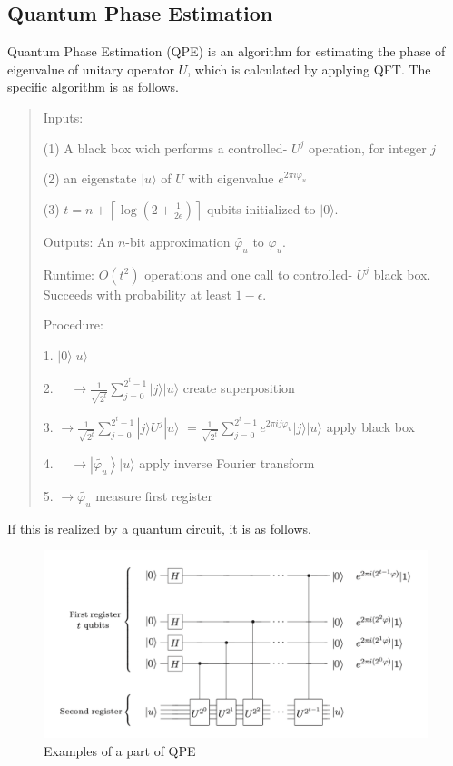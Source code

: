 \documentclass[b5paper,papersize,dvipdfmx,fleqn]{article}
\begin{document}
\subsection{Quantum Phase Estimation}
Quantum Phase Estimation (QPE) is an algorithm for estimating the phase of eigenvalue of unitary operator $U$, which is calculated by applying QFT. The specific algorithm is as follows.
\begin{quotation}

  Inputs:

   (1) A black box wich performs a controlled- $U^{j}$ operation, for integer $j$

   (2) an eigenstate $|u\rangle$ of $U$ with eigenvalue $e^{2 \pi i \varphi_{u}}$

   (3) $t=n+\left\lceil\log \left(2+\frac{1}{2 \epsilon}\right)\right\rceil$ qubits initialized to $|0\rangle$.


  Outputs: An $n$-bit approximation $\widetilde{\varphi_{u}}$ to $\varphi_{u} .$


  Runtime: $O\left(t^{2}\right)$ operations and one call to controlled- $U^{j}$ black box. Succeeds with probability at least $1-\epsilon$.


  Procedure:


  1. $|0\rangle|u\rangle$


  2. $\quad \rightarrow \frac{1}{\sqrt{2^{t}}} \sum_{j=0}^{2^{t}-1}|j\rangle|u\rangle$ create superposition


  3. $\rightarrow \frac{1}{\sqrt{2^{t}}} \sum_{j=0}^{2^{t}-1}|j\rangle U^{j}|u\rangle$ $=\frac{1}{\sqrt{2^{t}}} \sum_{j=0}^{2^{t}-1} e^{2 \pi i j \varphi_{u}}|j\rangle|u\rangle$ apply black box


  4. $\quad \rightarrow\left|\widetilde{\varphi_{u}}\right\rangle|u\rangle$ apply inverse Fourier transform


  5. $\rightarrow \widetilde{\varphi_{u}}$ measure first register
\end{quotation}


If this is realized by a quantum circuit, it is as follows.
\begin{center}
  \begin{figure}[H]
       \includegraphics[width=\textwidth]{qpe.pdf}
       \caption{Examples of a part of QPE}
       \label{circuit}
  \end{figure}
\end{center}
\end{document}
